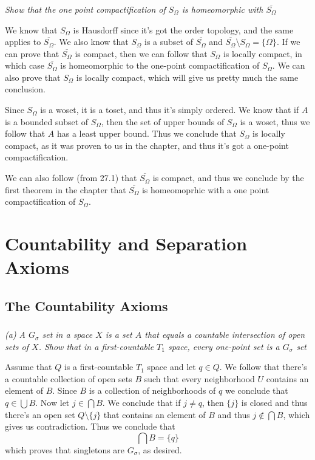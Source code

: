 \documentclass[11pt,oneside,titlepage]{book}
\newcommand{\set}[1]{\{ #1 \}}
\begin{document}
\subsection{}

\textit{Show that the one point compactification of $S_\Omega$ is homeomorphic
  with $\overline{S_\Omega}$}

We know that $S_\Omega$ is Hausdorff since it's got the order topology, and the same
applies to $\overline{S_\Omega}$. 
We also know that $S_\Omega$ is a subset of $\overline{S_\Omega}$ and $\overline{S_\Omega} \setminus
S_\Omega = \set{\Omega}$. If we can prove that $\overline{S_\Omega}$ is compact, then we can
follow that $S_\Omega$ is locally compact, in which case $\overline{S_\Omega}$ is homeomorphic
to the one-point compactification of $S_\Omega$. We can also prove that $S_\Omega$ is
locally compact, which will give us pretty much the same conclusion.

Since $S_\Omega$ is a woset, it is a toset, and thus it's simply ordered. We know that if $A$ is a
bounded subset of $S_\Omega$, then the set of upper bounds of $S_\Omega$ is a woset, thus we follow
that $A$ has a least upper bound. Thus we conclude that $S_\Omega$ is locally compact, as it was
proven to us in the chapter, and thus it's got a one-point compactification.

We can also follow (from 27.1) that $\overline{S_\Omega}$ is compact, and thus we conclude by
the first theorem in the chapter that $\overline{S_\Omega}$ is homeomoprhic with a one
point compactification of $S_\Omega$.

\chapter{Countability and Separation Axioms}

\section{The Countability Axioms}

\subsection{}

\textit{(a) A $G_\sigma$ set in a space $X$ is a set $A$ that equals a countable intersection
  of open sets of $X$. Show that in a first-countable $T_1$ space, every one-point set is a
  $G_\sigma$ set}

Assume that $Q$ is a first-countable $T_1$ space and let $q \in Q$. We follow that there's a
countable collection of open sets $B$ such that every neighborhood $U$ contains an element of $B$.
Since $B$ is a collection of neighborhoods of $q$ we conclude that
$q \in \bigcup{B}$. Now let $j \in \bigcap{B}$. We conclude that if $j \neq q$, then $\set{j}$
is closed and thus there's an open set $Q \setminus \set{j}$ that contains
an element of $B$ and thus $j \notin \bigcap{B}$, which gives us contradiction. Thus we
conclude that
$$\bigcap{B} = \set{q}$$
which proves that singletons are $G_\sigma$, as desired.
\end{document}
